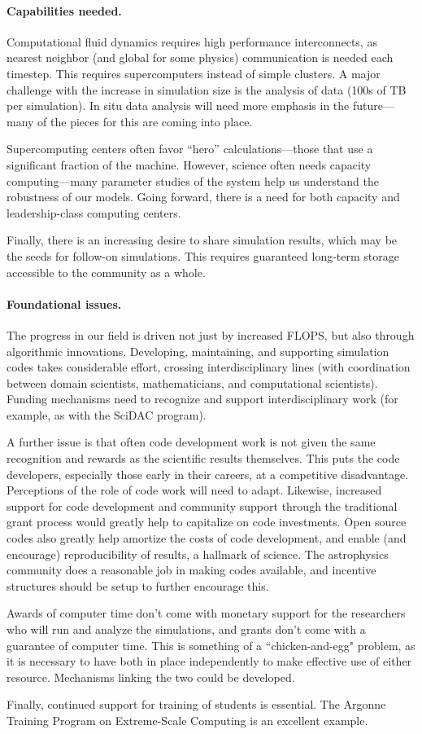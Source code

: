 \documentclass[11pt,twocolumn]{article}
\begin{document}
\paragraph*{Capabilities needed.}  Computational fluid dynamics requires
high performance interconnects, as nearest neighbor (and global for
some physics) communication is needed each timestep.  This requires
supercomputers instead of simple clusters.  A major challenge with the
increase in simulation size is the analysis of data (100s of TB
per simulation).  In situ data analysis will need more emphasis in the
future---many of the pieces for this are coming into place.

Supercomputing centers often favor ``hero'' calculations---those that
use a significant fraction of the machine.
However, science often needs capacity computing---many parameter
studies of the system help us understand the robustness of our models.
Going forward, there is a need for both capacity and leadership-class
computing centers.

Finally, there is an increasing desire to share simulation results,
which may be the seeds for follow-on simulations.  This
requires guaranteed long-term storage accessible to the community as a
whole.

\paragraph*{Foundational issues.}

The progress in our field is driven not just by increased FLOPS, but
also through algorithmic innovations.  Developing, maintaining, and
supporting simulation codes takes considerable effort, crossing
interdisciplinary lines (with coordination between domain scientists,
mathematicians, and computational scientists).  Funding mechanisms
need to recognize and support interdisciplinary work (for
example, as with the SciDAC program).

A further issue is that
often code development work is not given the same recognition and
rewards as the scientific results themselves.  This puts the code
developers, especially those early in their careers, at a competitive
disadvantage.  Perceptions of the role of code work will need to
adapt.  Likewise, increased support for code development and community
support through the traditional grant process would greatly help to
capitalize on code investments.  Open source codes also greatly help
amortize the costs of code development, and enable (and encourage)
reproducibility of results, a hallmark of science.  The astrophysics
community does a reasonable job in making codes available, and
incentive structures should be setup to further encourage this.

Awards of computer time don't come with monetary support for the
researchers who will run and analyze the simulations, and grants don't
come with a guarantee of computer time.  This is something of a
``chicken-and-egg" problem, as it is necessary to have both in place
independently to make effective use of either resource.  Mechanisms
linking the two could be developed.

Finally, continued support for training of students is essential. The
Argonne Training Program on Extreme-Scale Computing is an excellent
example.
\end{document}
